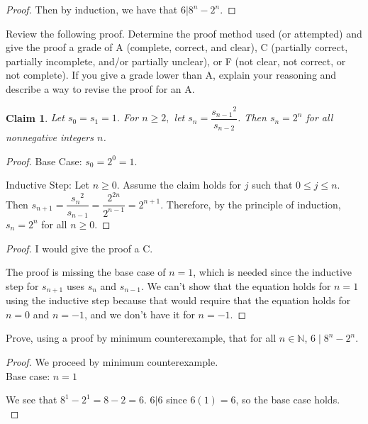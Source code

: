 \documentclass[12 pt]{exam}
\newtheorem{claim}{Claim}
\begin{document}
\begin{questions}
\begin{solution}
\begin{proof}
Then by induction, we have that $6 | 8^n - 2^n$.
\end{proof}\end{solution}


\newpage

\question  Review the following proof. Determine the proof method used (or attempted) and give the proof a grade of A (complete, correct, and clear), C (partially correct, partially incomplete, and/or partially unclear), or F (not clear, not correct, or not complete). If you give a grade lower than A, explain your reasoning and describe a way to revise the proof for an A. 

\begin{claim} Let $s_0=s_1=1$. For $n \geq 2,$ let $s_n=\dfrac{{s_{n-1}}^2}{s_{n-2}}$. Then $s_n=2^n$ for all nonnegative integers $n$. \end{claim}

\begin{proof} Base Case: $s_0=2^0=1$. 

Inductive Step: Let $n \geq 0$. Assume the claim holds for $j$ such that $0 \leq j \leq n$. Then $s_{n+1}= \dfrac{{s_{n}}^2}{s_{n-1}}=\dfrac{{2}^{2n}}{2^{n-1}}=2^{n+1}$. Therefore, by the principle of induction, $s_n=2^n$ for all $n \geq 0$. \end{proof}

\begin{solution}\begin{proof}
I would give the proof a C.

The proof is missing the base case of $n=1$, which is needed since the inductive step for $s_{n+1}$ uses
$s_{n}$ and $s_{n-1}$. We can't show that the equation holds for $n=1$ using the inductive step
because that would require that the equation holds for $n=0$ and $n=-1$, and we don't have it for $n=-1$.
\end{proof}\end{solution}


\question Prove, using a proof by minimum counterexample, that for all $n \in \mathbb{N}$, $6 \mid 8^n - 2^n$.

\begin{solution}\begin{proof}
We proceed by minimum counterexample.\\

Base case: $n=1$

We see that $8^1 - 2^1 = 8 - 2 = 6$. $6|6$ since $6(1) = 6$, so the base case holds.\\


\end{proof}
\end{solution}
\end{questions}
\end{document}
